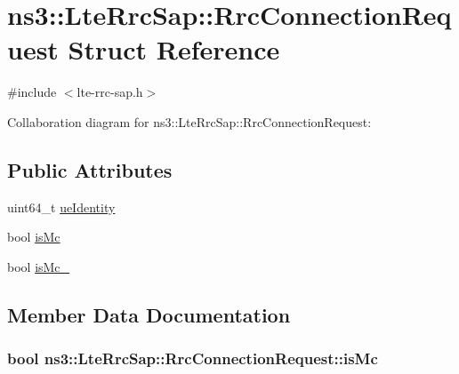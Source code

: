 \hypertarget{structns3_1_1LteRrcSap_1_1RrcConnectionRequest}{}\section{ns3\+:\+:Lte\+Rrc\+Sap\+:\+:Rrc\+Connection\+Request Struct Reference}
\label{structns3_1_1LteRrcSap_1_1RrcConnectionRequest}


{\ttfamily \#include $<$lte-\/rrc-\/sap.\+h$>$}



Collaboration diagram for ns3\+:\+:Lte\+Rrc\+Sap\+:\+:Rrc\+Connection\+Request\+:
\subsection*{Public Attributes}
\begin{DoxyCompactItemize}
\item 
uint64\+\_\+t \hyperlink{structns3_1_1LteRrcSap_1_1RrcConnectionRequest_ad6475f1d8216fa091d0f42866197eee5}{ue\+Identity}
\item 
bool \hyperlink{structns3_1_1LteRrcSap_1_1RrcConnectionRequest_ae2fbfe943b44ac1fb0dfe9cfcab3267e}{is\+Mc}
\item 
bool \hyperlink{structns3_1_1LteRrcSap_1_1RrcConnectionRequest_a6c7b19570aec22b302a4ba896a9f4aaf}{is\+Mc\+\_}
\end{DoxyCompactItemize}


\subsection{Member Data Documentation}
\subsubsection[{\texorpdfstring{is\+Mc}{isMc}}]{\setlength{\rightskip}{0pt plus 5cm}bool ns3\+::\+Lte\+Rrc\+Sap\+::\+Rrc\+Connection\+Request\+::is\+Mc}\hypertarget{structns3_1_1LteRrcSap_1_1RrcConnectionRequest_ae2fbfe943b44ac1fb0dfe9cfcab3267e}{}\label{structns3_1_1LteRrcSap_1_1RrcConnectionRequest_ae2fbfe943b44ac1fb0dfe9cfcab3267e}
